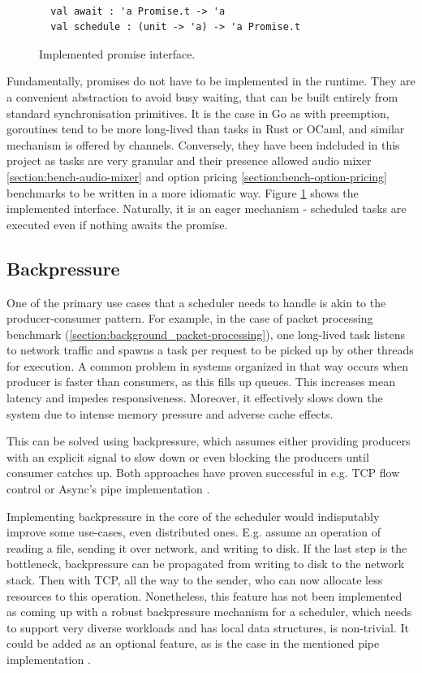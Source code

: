 \documentclass[12pt,a4paper,twoside]{report}
\begin{document}
\begin{figure}
    \centering
    \begin{verbatim}

  val await : 'a Promise.t -> 'a
  val schedule : (unit -> 'a) -> 'a Promise.t
    \end{verbatim}
    \caption{Implemented promise interface.}
    \label{fig:promise-interface}
\end{figure}


Fundamentally, promises do not have to be implemented in the runtime. They are a convenient abstraction to avoid busy waiting, that can be built entirely from standard synchronisation primitives. It is the case in Go \cite{chebyras74:online} as with preemption, goroutines tend to be more long-lived than tasks in Rust or OCaml, and similar mechanism is offered by channels. Conversely, they have been indcluded in this project as tasks are very granular and their presence allowed audio mixer \ref{section:bench-audio-mixer} and option pricing \ref{section:bench-option-pricing} benchmarks to be written in a more idiomatic way. Figure \ref{fig:promise-interface} shows the implemented interface. Naturally, it is an eager mechanism - scheduled tasks are executed even if nothing awaits the promise. 

\subsection{Backpressure}
One of the primary use cases that a scheduler needs to handle is akin to the producer-consumer pattern. For example, in the case of packet processing benchmark (\ref{section:background_packet-processing}), one long-lived task listens to network traffic and spawns a task per request to be picked up by other threads for execution. A common problem in systems organized in that way occurs when producer is faster than consumers, as this fills up queues. This increases mean latency and impedes responsiveness. Moreover, it effectively slows down the system due to intense memory pressure and adverse cache effects.

This can be solved using backpressure, which assumes either providing producers with an explicit signal to slow down or even blocking the producers until consumer catches up. Both approaches have proven successful in e.g. TCP flow control \cite{rfc793} or Async's pipe implementation \cite{async_kernel}. 

Implementing backpressure in the core of the scheduler would indisputably improve some use-cases, even distributed ones. E.g. assume an operation of reading a file, sending it over network, and writing to disk. If the last step is the bottleneck, backpressure can be propagated from writing to disk to the network stack. Then with TCP, all the way to the sender, who can now allocate less resources to this operation. Nonetheless, this feature has not been implemented as coming up with a robust backpressure mechanism for a scheduler, which needs to support very diverse workloads and has local data structures, is non-trivial. It could be added as an optional feature, as is the case in the mentioned pipe implementation \cite{async_kernel}. 
\end{document}
